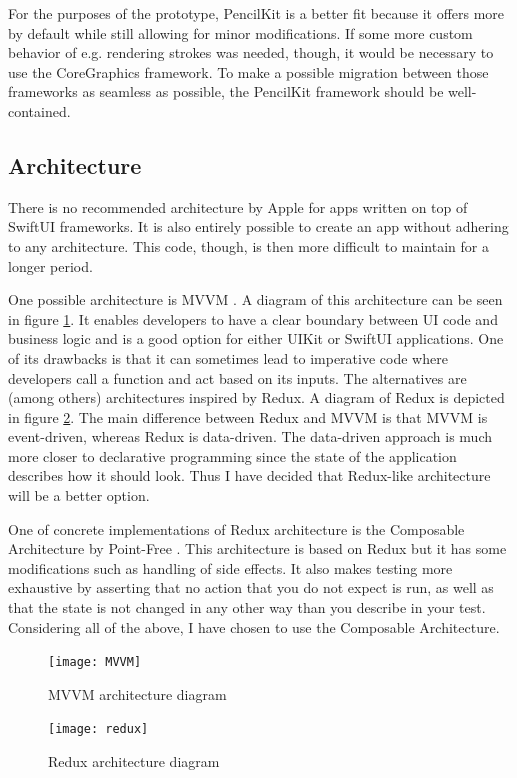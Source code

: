 For the purposes of the prototype, PencilKit is a better fit because it offers more by default while still allowing for minor modifications. If some more custom behavior of e.g. rendering strokes was needed, though, it would be necessary to use the CoreGraphics framework. To make a possible migration between those frameworks as seamless as possible, the PencilKit framework should be well-contained.

\subsection{Architecture}

There is no recommended architecture by Apple for apps written on top of SwiftUI frameworks. It is also entirely possible to create an app without adhering to any architecture. This code, though, is then more difficult to maintain for a longer period.

One possible architecture is MVVM \cite{mvvm}. A diagram of this architecture can be seen in figure \ref{mvvm}. It enables developers to have a clear boundary between UI code and business logic and is a good option for either UIKit or SwiftUI applications. One of its drawbacks is that it can sometimes lead to imperative code where developers call a function and act based on its inputs. The alternatives are (among others) architectures inspired by Redux. A diagram of Redux is depicted in figure \ref{redux}. The main difference between Redux and MVVM is that MVVM is event-driven, whereas Redux is data-driven. The data-driven approach is much more closer to declarative programming since the state of the application describes how it should look. Thus I have decided that Redux-like architecture will be a better option.

One of concrete implementations of Redux architecture is the Composable Architecture by Point-Free \cite{tca}. This architecture is based on Redux but it has some modifications such as handling of side effects. It also makes testing more exhaustive by asserting that no action that you do not expect is run, as well as that the state is not changed in any other way than you describe in your test. Considering all of the above, I have chosen to use the Composable Architecture. 

\begin{figure}
    \texttt{[image: MVVM]}
    \caption{MVVM architecture diagram \cite{mvvm}}\label{mvvm}
\end{figure}

\begin{figure}
    \texttt{[image: redux]}
    \caption{Redux architecture diagram \cite{react-redux}}\label{redux}
\end{figure}

